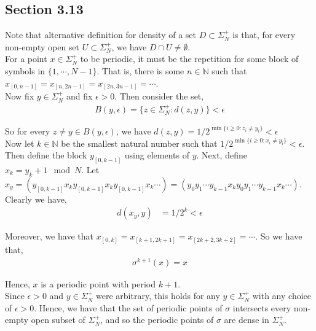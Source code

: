 \documentclass[12pt]{article}
\newenvironment{problem}[2][Problem]{\begin{trivlist}
\item[\hskip \labelsep {\bfseries #1}\hskip \labelsep {\bfseries #2.}]}{\end{trivlist}}
\begin{document}
\subsection{Section 3.13}

\begin{problem}{1}
\end{problem}

Note that alternative definition for density of a set $D \subset \Sigma_N^+$ is that, for every non-empty open set $U \subset \Sigma_N^+$, we have $D \cap U \neq \emptyset$.\\
 
For a point $x \in \Sigma_N^+$ to be periodic, it must be the repetition for some block of symbols in $\{1, \cdots, N-1\}$. That is, there is some $n \in \mathbb{N}$ such that $x_{[0, n-1]} = x_{[n, 2n-1]} = x_{[2n, 3n-1]} = \cdots$.\\

Now fix $y \in \Sigma_N^+$ and fix $\epsilon > 0$. Then consider the set,
\begin{align*}
B(y, \epsilon) = \{z \in \Sigma_N^+: d(z, y)\} < \epsilon
\end{align*}

So for every $z \neq y \in B(y, \epsilon)$, we have $d(z, y) = 1/2^{\min \{i \geq 0: z_i \neq y_i\}} < \epsilon$\\

Now let $k \in \mathbb{N}$ be the smallest natural number such that $1/2^{\min \{i \geq 0: x_i \neq y_i\}} < \epsilon$. Then define the block $y_{[0, k-1]}$ using elements of $y$. Next, define $x_k = y_k + 1 \mod N$. Let $x_y = (y_{[0, k-1]}x_ky_{[0, k-1]}x_ky_{[0, k-1]}x_k\cdots) = (y_0y_1\cdots y_{k-1}x_ky_0y_1\cdots y_{k-1}x_k\cdots)$. Clearly we have,
\begin{align*}
d(x_y, y) &= 1/2^k < \epsilon
\end{align*}

Moreover, we have that $x_{[0, k]} = x_{[k+1, 2k+1]} = x_{[2k+2, 3k+2]} = \cdots$. So we have that,
\begin{align*}
\sigma^{k+1}(x) = x
\end{align*}

Hence, $x$ is a periodic point with period $k+1$.\\

Since $\epsilon > 0$ and $y \in \Sigma_N^+$ were arbitrary, this holds for any $y \in \Sigma_N^+$ with any choice of $\epsilon > 0$. Hence, we have that the set of periodic points of $\sigma$ intersects every non-empty open subset of $\Sigma_N^+$, and so the periodic points of $\sigma$ are dense in $\Sigma_N^+$.\\
\end{document}
